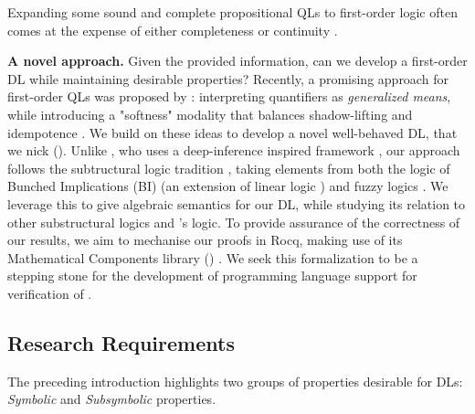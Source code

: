 Expanding some sound and complete propositional QLs to first-order logic often comes at the expense of either completeness or continuity \citep{cintula2011handbook, slusarz2023logic}.  

\textbf{A novel approach.} Given the provided information, can we develop a first-order DL while maintaining desirable properties?   Recently, a promising approach for first-order QLs was proposed by \citeauthor{capucci2024quantifiers}: interpreting quantifiers as \textit{generalized means}, while introducing a "softness" modality that balances shadow-lifting and idempotence \citep{capucci2024quantifiers}. We build on these ideas to develop a novel well-behaved DL, that we nick \emph{\OurLogic} (\OL). Unlike \citeauthor{capucci2024quantifiers}, who uses a deep-inference inspired framework \citep{guglielmi2007system, guglielmi2015deep}, our approach follows the subtructural logic tradition \citep{galatos2007residuated}, taking elements from both the logic of Bunched Implications (BI) \citep{o1999logic} (an extension of linear logic \citep{Wadler1993, agliano2025algebraic}) and fuzzy logics \citep{cintula2011handbook, prooffuzzy}. We leverage this to give algebraic semantics for our DL, while studying its relation to other substructural logics and \citeauthor{capucci2024quantifiers}'s logic. 
To provide assurance of the correctness of our results, we aim to mechanise our proofs in Rocq, making use of its Mathematical Components library (\mathcomp{}) \cite{mathcomp}. We seek this formalization to be a stepping stone for the development of programming language support for verification of \InAI{} \citep{vehicle}. 

\subsection{Research Requirements}
\label{ResearchRequirements}
The preceding introduction highlights two groups of properties desirable for DLs: \emph{Symbolic} and \emph{Subsymbolic} properties. 

